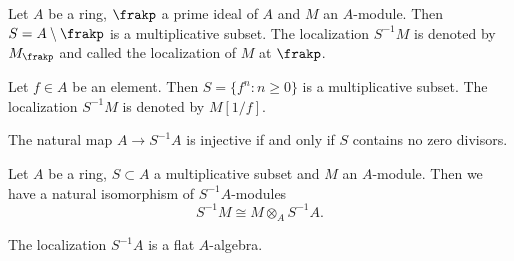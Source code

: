     \begin{example}\label{eg: localization at prime ideal and multiplicative set generated by one element}
        Let \(A\) be a ring, \(\frakp\) a prime ideal of \(A\) and \(M\) an \(A\)-module.
        Then \(S = A \setminus \frakp\) is a multiplicative subset.
        The localization \(S^{-1}M\) is denoted by \(M_\frakp\) and called the localization of \(M\) at \(\frakp\).

        Let \(f \in A\) be an element.
        Then \(S = \{ f^n \colon n \geq 0\}\) is a multiplicative subset.
        The localization \(S^{-1}M\) is denoted by \(M[1/f]\).
    \end{example}


    \begin{proposition}\label{prop: when is localization injective}
        The natural map \(A \to S^{-1}A\) is injective if and only if \(S\) contains no zero divisors.
    \end{proposition}

    \begin{proposition}\label{prop:localization_and_tensor_product}
        Let \(A\) be a ring, \(S \subset A\) a multiplicative subset and \(M\) an \(A\)-module.
        Then we have a natural isomorphism of \(S^{-1}A\)-modules
        \[ S^{-1}M \cong M \otimes_A S^{-1}A. \]
    \end{proposition}

    \begin{proposition}\label{prop:localization_are_flat}
        The localization \(S^{-1}A\) is a flat \(A\)-algebra.
    \end{proposition}

